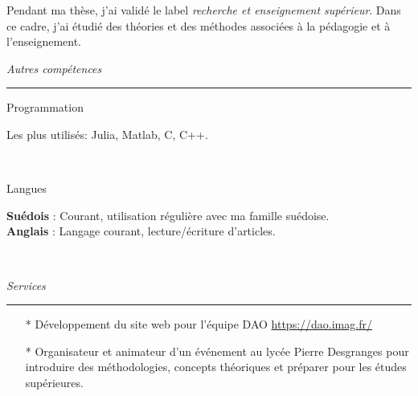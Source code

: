 \documentclass[a4paper,10pt, french]{article}
\begin{document}
\vspace{3mm}
Pendant ma thèse, j'ai validé le label \emph{recherche et enseignement supérieur}. Dans ce cadre, j'ai étudié des théories et des méthodes associées à la pédagogie et à l'enseignement.



\vspace{5mm}

\noindent
\textit{\Large \color{MyGray} \hspace{5mm} Autres compétences}
\vspace{2mm}
{\color{DefaultGray}\hrule height .1pt}
\vspace{5mm}

\noindent
\begin{minipage}{0.20\textwidth}
	\color{MyGray} Programmation
\end{minipage}
\hfill
\begin{minipage}{0.70\textwidth}
	Les plus utilisés: Julia, Matlab, C, C++.\\
\end{minipage}\\
\vspace{2mm}

\noindent
\begin{minipage}{0.20\textwidth}
	\color{MyGray} Langues
\end{minipage}
\hfill
\begin{minipage}{0.70\textwidth}
	\textbf{Suédois} : Courant, utilisation régulière avec ma famille suédoise.\\
	\textbf{Anglais} : Langage courant, lecture/écriture d'articles.\\
\end{minipage}\\
\vspace{2mm}

\noindent
\textit{\Large \color{MyGray} \hspace{5mm} Services}
\vspace{2mm}
{\color{DefaultGray}\hrule height .1pt}
\vspace{5mm}

\begin{itemize}
	\setlength\itemsep{3mm}
	\item[*] Développement du site web pour l'équipe DAO \url{https://dao.imag.fr/}
	\item[*] Organisateur et animateur d'un événement au lycée Pierre Desgranges pour introduire des méthodologies, concepts théoriques et préparer pour les études supérieures.
\end{itemize}
\vspace{5mm}
\end{document}
